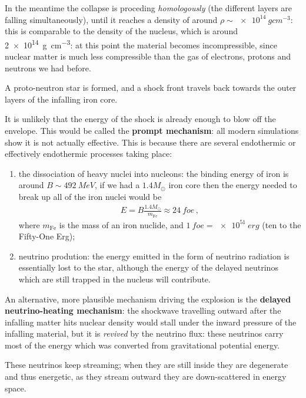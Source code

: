 \documentclass[main.tex]{subfiles}
\begin{document}
In the meantime the collapse is proceding \emph{homologously} (the different layers are falling simultaneously), until it reaches a density of around \(\rho \sim \SI{e14}{g cm^{-3}}\): this is comparable to the density of the nucleus, which is around \SI{2e14}{g cm^{-3}}: at this point the material becomes incompressible, since nuclear matter is much less compressible than the gas of electrons, protons and neutrons we had before.

A proto-neutron star is formed, and a shock front travels back towards the outer layers of the infalling iron core. 


It is unlikely that the energy of the shock is already enough to blow off the envelope. This would be called the \textbf{prompt mechanism}: all modern simulations show it is not actually effective.
This is because there are several endothermic or effectively endothermic processes taking place: 
\begin{enumerate}
  \item the dissociation of heavy nuclei into nucleons: the binding energy of iron is around \(B \sim \SI{492}{MeV}\), if we had a \(1.4 M_{\odot}\) iron core then the energy needed to break up all of the iron nuclei would be 
  \begin{align}
  E = B \frac{1.4 M_{\odot}}{m _{\text{Fe}}} \approx \SI{24}{foe}
  \,,
  \end{align}
  where \(m _{\text{Fe}}\) is the mass of an iron nuclide, and \(\SI{1}{foe} = \SI{e51}{erg}\) (ten to the Fifty-One Erg);
  \item neutrino prodution: the energy emitted in the form of neutrino radiation is essentially lost to the star, although
  the energy of the delayed neutrinos which are still trapped in the nucleus will contribute.
\end{enumerate}

An alternative, more plausible mechanism driving the explosion is the  \textbf{delayed neutrino-heating mechanism}: the shockwave travelling outward after the infalling matter hits nuclear density would stall under the inward pressure of the infalling material, but it is \emph{revived} by the neutrino flux: these neutrinos carry most of the energy which was converted from gravitational potential energy.

These neutrinos keep streaming; when they are still inside they are degenerate and thus energetic, as they stream outward they are down-scattered in energy space.
\end{document}
